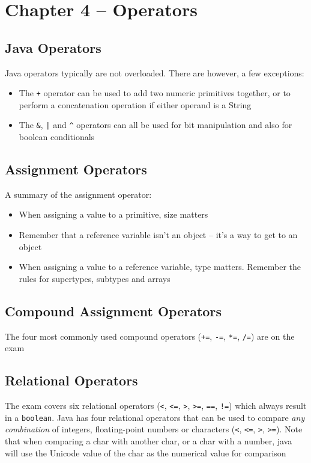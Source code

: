 \section{Chapter 4 -- Operators}
\subsection{Java Operators}
Java operators typically are not overloaded. There are however, a few 
exceptions:
\begin{itemize}
    \item The \verb#+# operator can be used to add two numeric primitives 
    together, or to perform a concatenation operation if either operand is a 
    String
    \item The \verb#&#, \verb#|# and \verb#^# operators can all be used for bit 
    manipulation and also for boolean conditionals
\end{itemize}

\subsection{Assignment Operators}
A summary of the assignment operator:
\begin{itemize}
    \item When assigning a value to a primitive, size matters
    \item Remember that a reference variable isn't an object -- it's a way to 
    get to an object
    \item When assigning a value to a reference variable, type matters.  
    Remember the rules for supertypes, subtypes and arrays
\end{itemize}

\subsection{Compound Assignment Operators}
The four most commonly used compound operators (\verb#+=#, \verb#-=#, 
\verb#*=#, \verb#/=#) are on the exam

\subsection{Relational Operators}
The exam covers six relational operators (\verb#<#, \verb#<=#, \verb#>#, 
\verb#>=#, \verb#==#, \verb#!=#) which always result in a \verb#boolean#. Java 
has four relational operators that can be used to compare \emph{any 
combination} of integers, floating-point numbers or characters (\verb#<#, 
\verb#<=#, \verb#>#, \verb#>=#). Note that when comparing a char with another 
char, or a char with a number, java will use the Unicode value of the char as 
the numerical value for comparison

